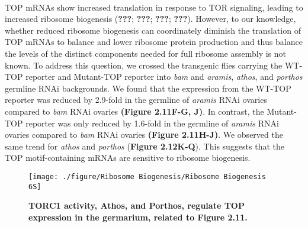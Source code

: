 \documentclass[12pt,oneside]{reedthesis}
\begin{document}

\textbf{\\
}

TOP mRNAs show increased translation in response to TOR signaling, leading to increased ribosome biogenesis ({\textbf{???}}; {\textbf{???}}; {\textbf{???}}; {\textbf{???}}). However, to our knowledge, whether reduced ribosome biogenesis can coordinately diminish the translation of TOP mRNAs to balance and lower ribosome protein production and thus balance the levels of the distinct components needed for full ribosome assembly is not known. To address this question, we crossed the transgenic flies carrying the WT-TOP reporter and Mutant-TOP reporter into \emph{bam} and \emph{aramis}, \emph{athos}, and \emph{porthos} germline RNAi backgrounds. We found that the expression from the WT-TOP reporter was reduced by 2.9-fold in the germline of \emph{aramis} RNAi ovaries compared to \emph{bam} RNAi ovaries \textbf{(Figure 2.11F-G, J)}. In contrast, the Mutant-TOP reporter was only reduced by 1.6-fold in the germline of \emph{aramis} RNAi ovaries compared to \emph{bam} RNAi ovaries \textbf{(Figure 2.11H-J)}. We observed the same trend for \emph{athos} and \emph{porthos} (\textbf{Figure 2.12K-Q}). This suggests that the TOP motif-containing mRNAs are sensitive to ribosome biogenesis.
\begin{figure}

{\centering \texttt{[image: ./figure/Ribosome Biogenesis/Ribosome Biogenesis 6S]} 

}

\caption[\textbf{TORC1 activity, Athos, and Porthos, regulate TOP expression in the germarium, related to Figure 2.11.}]{\textbf{TORC1 activity, Athos, and Porthos, regulate TOP expression in the germarium, related to Figure 2.11.}}\label{fig:unnamed-chunk-17}
\end{figure}
\end{document}
